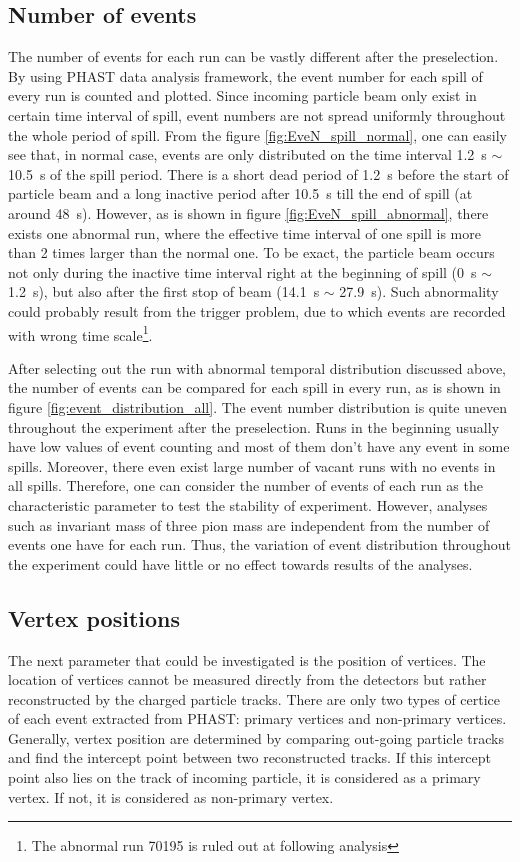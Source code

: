 \subsection{Number of events}
The number of events for each run can be vastly different after the preselection. By using PHAST data analysis framework, the event number for each spill of every run is counted and plotted. Since incoming particle beam only exist in certain time interval of spill, event numbers are not spread uniformly throughout the whole period of spill. From the figure \ref{fig:EveN_spill_normal}, one can easily see that, in normal case, events are only distributed on the time interval \SI{1.2}{\second} $\sim$ \SI{10.5}{\second} of the spill period. There is a short dead period of \SI{1.2}{\second} before the start of particle beam and a long inactive period after \SI{10.5}{\second} till the end of spill (at around \SI{48}{\second}). However, as is shown in figure \ref{fig:EveN_spill_abnormal}, there exists one abnormal run, where the effective time interval of one spill is more than 2 times larger than the normal one. To be exact, the particle beam occurs not only during the inactive time interval right at the beginning of spill (\SI{0}{\second} $\sim$ \SI{1.2}{\second}), but also after the first stop of beam (\SI{14.1}{\second} $\sim$ \SI{27.9}{\second}). Such abnormality could probably result from the trigger problem, due to which events are recorded with wrong time scale\footnote[2]{The abnormal run 70195 is ruled out at following analysis}.

After selecting out the run with abnormal temporal distribution discussed above, the number of events can be compared for each spill in every run, as is shown in figure \ref{fig:event_distribution_all}. The event number distribution is quite uneven throughout the experiment after the preselection. Runs in the beginning usually have low values of event counting and most of them don't have any event in some spills. Moreover, there even exist large number of vacant runs with no events in all spills. Therefore, one can consider the number of events of each run as the characteristic parameter to test the stability of experiment. However, analyses such as invariant mass of three pion mass are independent from the number of events one have for each run. Thus, the variation of event distribution throughout the experiment could have little or no effect towards results of the analyses.

\subsection{Vertex positions}
The next parameter that could be investigated is the position of vertices. The location of vertices cannot be measured directly from the detectors but rather reconstructed by the charged particle tracks. There are only two types of certice of each event extracted from PHAST: primary vertices and non-primary vertices. Generally, vertex position are determined by comparing out-going particle tracks and find the intercept point between two reconstructed tracks. If this intercept point also lies on the track of incoming particle, it is considered as a primary vertex. If not, it is considered as non-primary vertex. 

